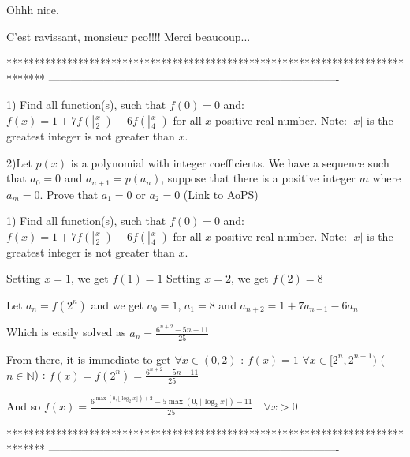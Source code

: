 \begin{solution}
	Ohhh nice.
\end{solution}



\begin{solution}
	C'est ravissant, monsieur pco!!!! Merci beaucoup...
\end{solution}
*******************************************************************************
-------------------------------------------------------------------------------

\begin{problem}
	1) Find all function(s), such that $f(0) = 0$ and:
$f(x) = 1 + 7f(|\frac{x}{2}|) - 6f(|\frac{x}{4}|)$ for all $x$ positive real number.
Note: $|x|$ is the greatest integer is not greater than $x$.

2)Let $p(x)$ is a polynomial with integer coefficients. We have a sequence such that $a_0 = 0$ and $a_{n + 1} = p(a_n)$, suppose that there is a positive integer $m$ where $a_m = 0$.
Prove that $a_1 = 0$ or $a_2 = 0$
	\flushright \href{https://artofproblemsolving.com/community/c6h1574033}{(Link to AoPS)}
\end{problem}



\begin{solution}
	\begin{tcolorbox}1) Find all function(s), such that $f(0) = 0$ and:
$f(x) = 1 + 7f(|\frac{x}{2}|) - 6f(|\frac{x}{4}|)$ for all $x$ positive real number.
Note: $|x|$ is the greatest integer is not greater than $x$.\end{tcolorbox}
Setting $x=1$, we get $f(1)=1$
Setting $x=2$, we get $f(2)=8$

Let $a_n=f(2^n)$ and we get 
$a_0=1$, $a_1=8$ and $a_{n+2}=1+7a_{n+1}-6a_n$

Which is easily solved as $a_n=\frac{6^{n+2}-5n-11}{25}$

From there, it is immediate to get 
$\forall x\in(0,2)$ : $f(x)=1$
$\forall x\in[2^n,2^{n+1})$ ($n\in\mathbb N$) : $f(x)=f(2^n)=\frac{6^{n+2}-5n-11}{25}$

And so $\boxed{f(x)=\frac{6^{\max(0,\lfloor\log_2 x\rfloor)+2}-5\max(0,\lfloor\log_2 x\rfloor)-11}{25}\quad\forall x>0}$



\end{solution}
*******************************************************************************
-------------------------------------------------------------------------------

